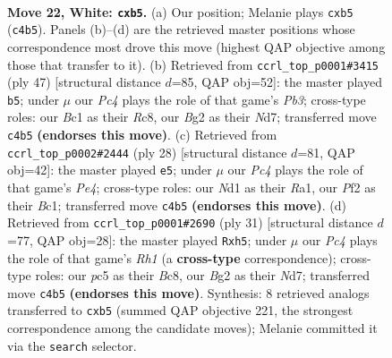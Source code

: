 \documentclass[11pt]{article}
\begin{document}
\clearpage

\begin{figure}[p]\centering
\begin{subfigure}{0.46\textwidth}\centering
\resizebox{\linewidth}{!}{%
\newchessgame
\chessboard[
  setfen={1nb2rk1/r5b1/5n2/ppp1p3/2P1p1p1/1P4P1/P2NRPB1/1RBN2K1 w - - 0 22},
  showmover=false,
  pgfstyle=straightmove, color=movearrow, markmove={c4-b5}
]}
\caption{}
\end{subfigure}\hfill
\begin{subfigure}{0.46\textwidth}\centering
\resizebox{\linewidth}{!}{%
\newchessgame
\chessboard[
  setfen={2rr2k1/p2nbpp1/1pp4p/3nP3/NP6/2P3PP/1P1B1P2/R2KRB2 b - - 0 24},
  showmover=false,
  pgfstyle=straightmove, color=movearrow, markmove={b6-b5}
]}
\caption{}
\end{subfigure}
\\[4pt]
\begin{subfigure}{0.46\textwidth}\centering
\resizebox{\linewidth}{!}{%
\newchessgame
\chessboard[
  setfen={r3kb1r/1pp3p1/p5n1/2pP1p1p/4P3/2N2P1P/PP3P2/R1BR2K1 w kq - 0 15},
  showmover=false,
  pgfstyle=straightmove, color=movearrow, markmove={e4-e5}
]}
\caption{}
\end{subfigure}\hfill
\begin{subfigure}{0.46\textwidth}\centering
\resizebox{\linewidth}{!}{%
\newchessgame
\chessboard[
  setfen={r1b1k2r/1p1nnpp1/p3p3/3pP2P/3N1P2/P1P1B3/2P4P/2KR1B1R b kq - 0 16},
  showmover=false,
  pgfstyle=straightmove, color=movearrow, markmove={h8-h5}
]}
\caption{}
\end{subfigure}
\caption{\textbf{Move 22, White: \texttt{cxb5}.} (a) Our position; Melanie plays \texttt{cxb5} (\texttt{c4b5}). Panels (b)--(d) are the retrieved master positions whose correspondence most drove this move (highest QAP objective among those that transfer to it). (b) Retrieved from \texttt{ccrl\_top\_p0001\#3415} (ply 47) [structural distance $d$=85, QAP obj=52]: the master played \texttt{b5}; under $\mu$ our \emph{Pc4} plays the role of that game's \emph{Pb3}; cross-type roles: our \emph{B}c1 as their \emph{R}c8, our \emph{B}g2 as their \emph{N}d7; transferred move \texttt{c4b5} \textbf{(endorses this move)}. (c) Retrieved from \texttt{ccrl\_top\_p0002\#2444} (ply 28) [structural distance $d$=81, QAP obj=42]: the master played \texttt{e5}; under $\mu$ our \emph{Pc4} plays the role of that game's \emph{Pe4}; cross-type roles: our \emph{N}d1 as their \emph{R}a1, our \emph{P}f2 as their \emph{B}c1; transferred move \texttt{c4b5} \textbf{(endorses this move)}. (d) Retrieved from \texttt{ccrl\_top\_p0001\#2690} (ply 31) [structural distance $d$=77, QAP obj=28]: the master played \texttt{Rxh5}; under $\mu$ our \emph{Pc4} plays the role of that game's \emph{Rh1} (a \textbf{cross-type} correspondence); cross-type roles: our \emph{p}c5 as their \emph{B}c8, our \emph{B}g2 as their \emph{N}d7; transferred move \texttt{c4b5} \textbf{(endorses this move)}. Synthesis: 8 retrieved analogs transferred to \texttt{cxb5} (summed QAP objective 221, the strongest correspondence among the candidate moves); Melanie committed it via the \texttt{search} selector.}
\label{fig:thought-m42}
\end{figure}
\end{document}
